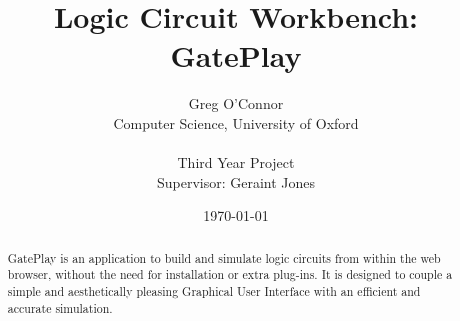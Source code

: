\documentclass[a4paper,notitlepage]{report}
\begin{document}
\title{Logic Circuit Workbench: GatePlay}
\author{Greg O'Connor \\
		Computer Science, University of Oxford \\
		\\
		Third Year Project\\
		Supervisor: Geraint Jones}
\date{\today}
\maketitle

\begin{abstract}
GatePlay is an application to build and simulate logic circuits from within the web browser, without the need for installation or extra plug-ins. It is designed to couple a simple and aesthetically pleasing Graphical User Interface with an efficient and accurate simulation.
\end{abstract}
\clearpage

\tableofcontents
\clearpage


\clearpage

\clearpage

\clearpage

\clearpage

\clearpage

\clearpage

\clearpage

\end{document}
